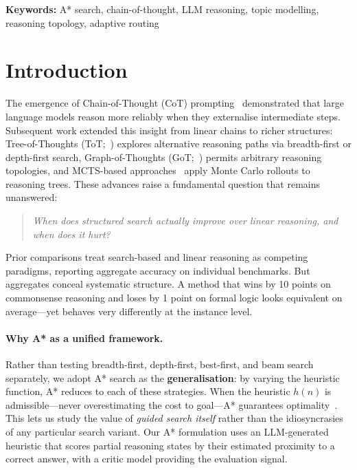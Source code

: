 \documentclass[11pt]{article}
\begin{document}
\vspace{0.5em}
\noindent\textbf{Keywords:} A* search, chain-of-thought, LLM reasoning, topic modelling, reasoning topology, adaptive routing

\section{Introduction}
\label{sec:intro}

The emergence of Chain-of-Thought (CoT) prompting~\citep{wei2022chain} demonstrated that large language models reason more reliably when they externalise intermediate steps. Subsequent work extended this insight from linear chains to richer structures: Tree-of-Thoughts (ToT;~\citealt{yao2024tree}) explores alternative reasoning paths via breadth-first or depth-first search, Graph-of-Thoughts (GoT;~\citealt{besta2024graph}) permits arbitrary reasoning topologies, and MCTS-based approaches~\citep{hao2023reasoning} apply Monte Carlo rollouts to reasoning trees. These advances raise a fundamental question that remains unanswered:

\begin{quote}
\emph{When does structured search actually improve over linear reasoning, and when does it hurt?}
\end{quote}

Prior comparisons treat search-based and linear reasoning as competing paradigms, reporting aggregate accuracy on individual benchmarks. But aggregates conceal systematic structure. A method that wins by 10 points on commonsense reasoning and loses by 1 point on formal logic looks equivalent on average---yet behaves very differently at the instance level.

\paragraph{Why A* as a unified framework.}
Rather than testing breadth-first, depth-first, best-first, and beam search separately, we adopt A* search as the \textbf{generalisation}: by varying the heuristic function, A* reduces to each of these strategies. When the heuristic $h(n)$ is admissible---never overestimating the cost to goal---A* guarantees optimality~\citep{hart1968formal}. This lets us study the value of \emph{guided search itself} rather than the idiosyncrasies of any particular search variant. Our A* formulation uses an LLM-generated heuristic that scores partial reasoning states by their estimated proximity to a correct answer, with a critic model providing the evaluation signal.
\end{document}
